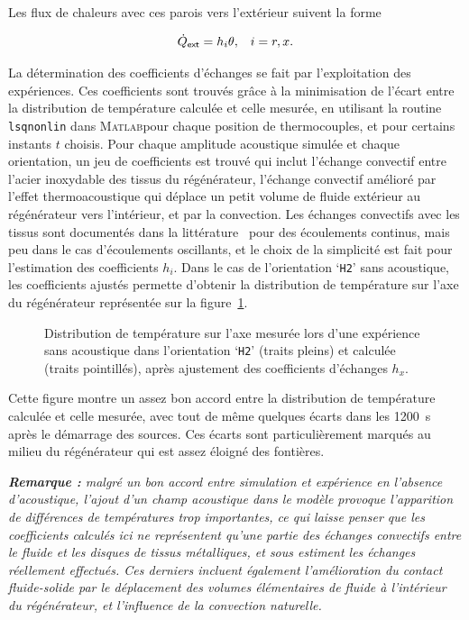 \begin{enumerate}[label=\textbf{(\roman*)}]
Les flux de chaleurs avec ces parois vers l'extérieur suivent la forme 

\begin{align}
	\dot Q_{\sf ext} &= h_i\theta,&i=r,x.
	\label{eq:FluxLat_Transitoire}
\end{align}

La détermination des coefficients d'échanges se fait par l'exploitation des expériences. Ces coefficients sont trouvés grâce à la minimisation de l'écart entre la distribution de température calculée et celle mesurée, en utilisant la routine \texttt{lsqnonlin} dans \textsc{Matlab}\textss\textregistered pour chaque position de thermocouples, et pour certains instants $t$ choisis. Pour chaque amplitude acoustique simulée et chaque orientation, un jeu de coefficients est trouvé qui inclut l'échange convectif entre l'acier inoxydable des tissus du régénérateur, l'échange convectif amélioré par l'effet thermoacoustique qui déplace un petit volume de fluide extérieur au régénérateur vers l'intérieur, et par la convection. Les échanges convectifs avec les tissus sont documentés dans la littérature~\cite{tian_cross_2007, g_correlations_2022} pour des écoulements continus, mais peu dans le cas d'écoulements oscillants, et le choix de la simplicité est fait pour l'estimation des coefficients $h_i$. Dans le cas de l'orientation `\texttt{H2}' sans acoustique, les coefficients ajustés permette d'obtenir  la distribution de température sur l'axe du régénérateur représentée sur la figure~\ref{fig:TransitoireFit}.

\begin{figure}[!ht]
	\centering
	
	\caption{Distribution de température sur l'axe mesurée lors d'une expérience sans acoustique dans l'orientation `\texttt{H2}' (traits pleins) et calculée (traits pointillés), après ajustement des coefficients d'échanges $h_x$.}
	\label{fig:TransitoireFit}
\end{figure}

Cette figure montre un assez bon accord entre la distribution de température calculée et celle mesurée, avec tout de même quelques écarts dans les \qty{1200}{\second} après le démarrage des sources. Ces écarts sont particulièrement marqués au milieu du régénérateur qui est assez éloigné des fontières.\medskip

\textit{\textbf{Remarque :} malgré un bon accord entre simulation et expérience en l'absence d'acoustique, l'ajout d'un champ acoustique dans le modèle provoque l'apparition de différences de températures trop importantes, ce qui laisse penser que les coefficients calculés ici ne représentent qu'une partie des échanges convectifs entre le fluide et les disques de tissus métalliques, et sous estiment les échanges réellement effectués. Ces derniers incluent également l'amélioration du contact fluide-solide par le déplacement des volumes élémentaires de fluide à l'intérieur du régénérateur, et l'influence de la convection naturelle.}


\end{enumerate}

